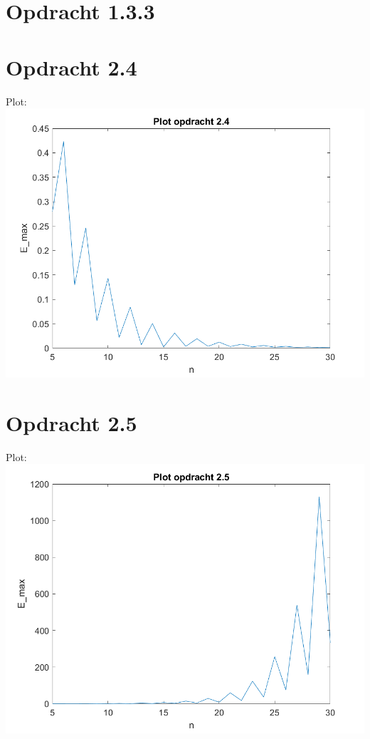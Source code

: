 \documentclass[a4paper]{article}
\begin{document}
%
%
%
%
%
\section*{Opdracht 1.3.3}

%
%
%
%
%
%
\section*{Opdracht 2.4}
Plot:
\\{}
\includegraphics[scale = 0.8]{plot2_4}
%
%
%
%
%
%
\section*{Opdracht 2.5}
Plot:
\\{}
\includegraphics[scale = 0.8]{plot2_5}
%
%
%
%
%
%
\end{document}
